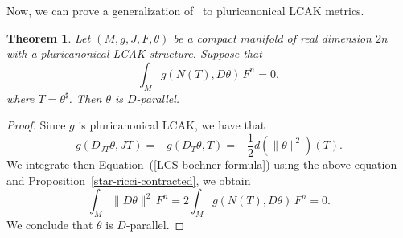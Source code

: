 \documentclass[a4paper,11pt]{amsart}
\newtheorem{thm}{Theorem}
\theoremstyle{definition}
\renewcommand{\[}{\begin{equation*}}
\renewcommand{\]}{\end{equation*}}
\begin{document}
Now, we can prove a generalization of~\cite{MR4771164,MR3674175} to pluricanonical LCAK metrics.
\begin{thm}\label{generalization-Ornea-Verbitsky}
Let $(M, g, J, F, \theta)$ be a compact manifold of real dimension $2n$ with a pluricanonical LCAK structure. Suppose that 
\begin{equation}\label{theta-killing-condition}
\int_Mg(N(T),D\theta)\,F^n=0,
\end{equation}
where $T=\theta^\sharp$. Then $\theta$ is $D$-parallel.
\end{thm}
\begin{proof}
 
Since $g$ is pluricanonical LCAK, we have that
$$g(D_{JT}\theta,JT)=-g(D_{T}\theta,T)=-\frac{1}{2}d(\|\theta\|^2)(T).$$
We integrate then Equation~(\ref{LCS-bochner-formula}) using the above equation and Proposition~\ref{star-ricci-contracted}, we obtain
$$\int_M\|D\theta\|^2\,F^n=2\int_Mg(N(T),D\theta)\,F^n=0.$$
We conclude that $\theta$ is $D$-parallel.
\end{proof}
\end{document}
